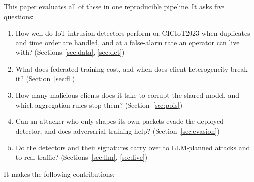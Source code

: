 \documentclass[conference]{IEEEtran}
\begin{document}
This paper evaluates all of these in one reproducible pipeline. It asks five questions:
\begin{enumerate}
\item[RQ1] How well do IoT intrusion detectors perform on CICIoT2023 when duplicates and time order are handled, and at a false-alarm rate an operator can live with? (Sections~\ref{sec:data}, \ref{sec:det})
\item[RQ2] What does federated training cost, and when does client heterogeneity break it? (Section~\ref{sec:fl})
\item[RQ3] How many malicious clients does it take to corrupt the shared model, and which aggregation rules stop them? (Section~\ref{sec:pois})
\item[RQ4] Can an attacker who only shapes its own packets evade the deployed detector, and does adversarial training help? (Section~\ref{sec:evasion})
\item[RQ5] Do the detectors and their signatures carry over to LLM-planned attacks and to real traffic? (Sections~\ref{sec:llm}, \ref{sec:live})
\end{enumerate}
It makes the following contributions:
\end{document}
